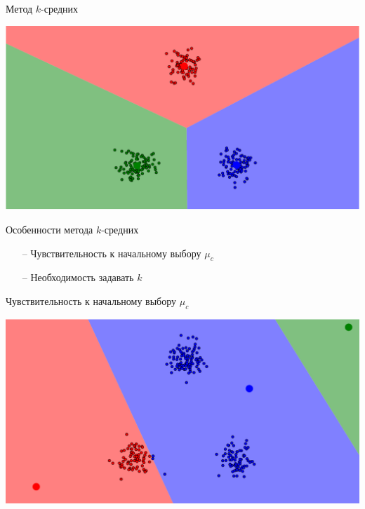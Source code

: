 \documentclass[10pt]{beamer}
\begin{document}
\begin{frame}{Метод $k$-средних}
	\begin{center}
	  \includegraphics[width= \textwidth, keepaspectratio = true]{images/kmeans4}   
	\end{center}
\end{frame}

\begin{frame}{Особенности метода $k$-средних}
	\begin{itemize}
		\item[--] Чувствительность к начальному выбору $\mu_c$
		\item[--] Необходимость задавать $k$
	\end{itemize}
\end{frame}

\begin{frame}{Чувствительность к начальному выбору $\mu_c$}
	\begin{center}
	  \includegraphics[width= \textwidth, keepaspectratio = true]{images/localmin1}  
	\end{center}
\end{frame}
\end{document}
